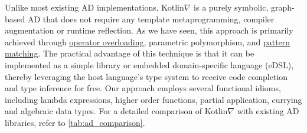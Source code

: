 Unlike most existing AD implementations, Kotlin$\nabla$ is a purely symbolic, graph-based AD that does not require any template metaprogramming, compiler augmentation or runtime reflection. As we have seen, this approach is primarily achieved through \hyperref[sec:operator-overloading]{operator overloading}, parametric polymorphism, and \hyperref[sec:adts]{pattern matching}. The practical advantage of this technique is that it can be implemented as a simple library or embedded domain-specific language (eDSL), thereby leveraging the host language's type system to receive code completion and type inference for free. Our approach employs several functional idioms, including lambda expressions, higher order functions, partial application, currying and algebraic data types. For a detailed comparison of Kotlin$\nabla$ with existing AD libraries, refer to \autoref{tab:ad_comparison}.\\

